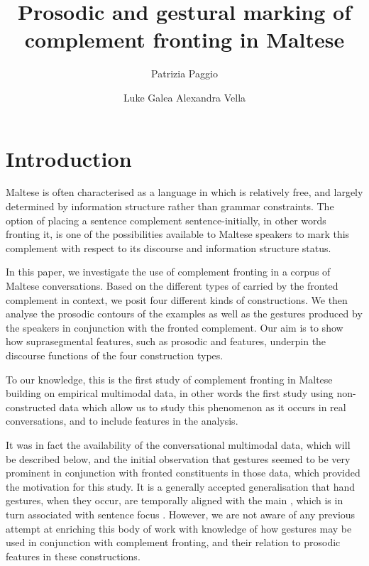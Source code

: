 \documentclass[output=paper]{LSP/langsci}
\author{Patrizia Paggio\affiliation{University of Copenhagen and University of Malta}\and
Luke Galea\affiliation{University of Malta}\lastand 
Alexandra Vella\affiliation{University of Malta}}
\title{Prosodic and gestural marking of  complement fronting in Maltese}
\begin{document}
\section{Introduction}
Maltese is often characterised as a language in which  is
relatively free, and largely determined by information structure
rather than grammar constraints.  The option of placing a sentence
complement sentence-initially, in other words fronting it, is one of
the possibilities available to Maltese speakers to mark this
complement with respect to its discourse and information structure
status.

In this paper, we investigate the use of complement fronting in a
corpus of Maltese conversations. Based on the different types of
 carried by the fronted complement in context, we
posit four different kinds of constructions. We then analyse the
prosodic contours of the examples as well as the gestures produced by
the speakers in conjunction with the fronted complement. Our aim is to
show how suprasegmental features, such as prosodic and 
 features, underpin the discourse functions of the four construction
types.


\largerpage
To our knowledge, this is the first study of complement fronting in
Maltese building on empirical multimodal data, in other words the
first study using non-constructed data which allow us to study this
phenomenon as it occurs in real conversations, and to include 
features in the analysis.

It was in fact the availability of the conversational multimodal data,
which will be described below, and the initial observation that
gestures seemed to be very prominent in conjunction with fronted
constituents in those data, which provided the motivation for this
study. It is a generally accepted generalisation that hand gestures,
when they occur, are temporally aligned with the main 
\citep{Kendon80,McNeill92,Loehr04,AlahverdzhievaLascarides10}, which
is in turn associated with sentence focus
\citep{Lambrecht1994,EV_EE95}. %
However, we are not aware of any previous
attempt at enriching this body of work with knowledge of how gestures
may be used in conjunction with complement fronting, and their
relation to prosodic features in these constructions.
\end{document}
